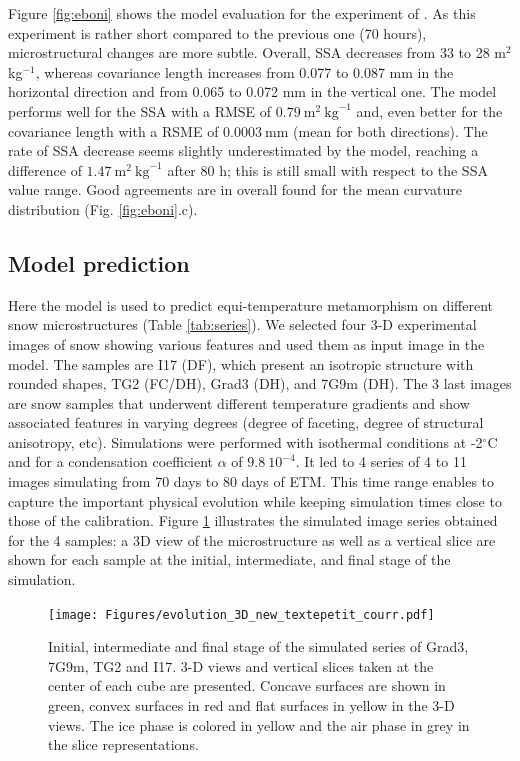 \documentclass[draft,ms]{agujournal2019}
\begin{document}
Figure \ref{fig:eboni} shows the model evaluation for the experiment of . As this experiment is rather short compared to the previous one (70 hours), microstructural changes are more subtle. Overall, SSA decreases from 33 to 28 m$^2$ kg$^{-1}$, whereas covariance length increases from 0.077 to 0.087 mm in the horizontal direction and from 0.065 to 0.072 mm in the vertical one. The model performs well for the SSA with a RMSE of $0.79\ \mathrm{m}^2\ \mathrm{kg}^{-1}$ and, even better for the covariance length with a RSME of $0.0003\ \mathrm{mm}$ (mean for both directions).
The rate of SSA decrease seems slightly underestimated by the model, reaching a difference of $1.47\ \mathrm{m}^2\ \mathrm{kg}^{-1}$ after 80 h; this is still small with respect to the SSA value range. Good agreements are in overall found for the mean curvature distribution (Fig. \ref{fig:eboni}.c). \\


\subsection{Model prediction}
\label{sec:prediction}

Here the model is used to predict equi-temperature metamorphism on different snow microstructures (Table \ref{tab:series}). We selected four 3-D experimental images of snow showing various features and used them as input image in the model. The samples are I17 (DF), which present an isotropic structure with rounded shapes, TG2 (FC/DH), Grad3 (DH), and 7G9m (DH). The 3 last images are snow samples that underwent different temperature gradients and show associated features in varying degrees (degree of faceting, degree of structural anisotropy, etc). Simulations were performed with isothermal conditions at -2$^\circ$C and for a condensation coefficient $\alpha$ of $9.8\ 10^{-4}$. It led to 4 series of 4 to 11 images simulating from 70 days to 80 days of ETM. This time range enables to capture the important physical evolution while keeping simulation times close to those of the calibration. Figure \ref{fig:evolutions_3D} illustrates the simulated image series obtained for the 4 samples: a 3D view of the microstructure as well as a vertical slice are shown for each sample at the initial, intermediate, and final stage of the simulation.\\

\begin{figure}
    \centering
    \texttt{[image: Figures/evolution\_3D\_new\_textepetit\_courr.pdf]}
    \caption{Initial, intermediate and final stage of the simulated series of Grad3, 7G9m, TG2 and I17. 3-D views and vertical slices taken at the center of each cube are presented. Concave surfaces are shown in green, convex surfaces in red and flat surfaces in yellow in the 3-D views. The ice phase is colored in yellow and the air phase in grey in the slice representations.}
    \label{fig:evolutions_3D}
\end{figure}
\end{document}
